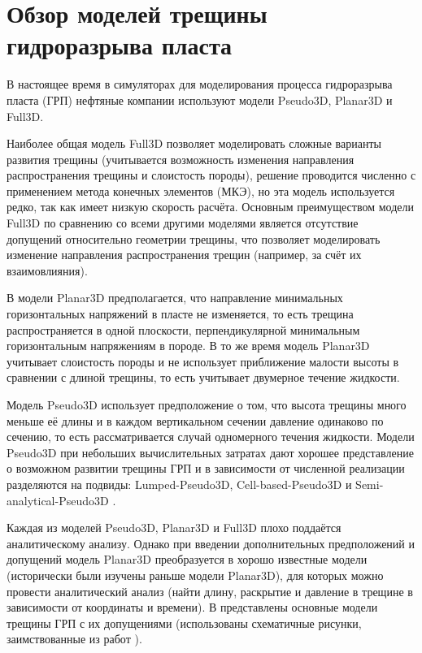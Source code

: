 \chapter{Обзор моделей трещины гидроразрыва пласта} \label{ch2}

В настоящее время в симуляторах для моделирования процесса гидроразрыва пласта (ГРП) нефтяные компании используют модели Pseudo3D, Planar3D и Full3D.

Наиболее общая модель Full3D позволяет моделировать сложные варианты развития трещины (учитывается возможность изменения направления распространения трещины и слоистость породы), решение проводится численно с применением метода конечных элементов (МКЭ), но эта модель используется редко, так как имеет низкую скорость расчёта.
Основным преимуществом модели Full3D по сравнению со всеми другими моделями является отсутствие допущений относительно геометрии трещины, что позволяет моделировать изменение направления распространения трещин (например, за счёт их взаимовлияния).

В модели Planar3D предполагается, что направление минимальных горизонтальных напряжений в пласте не изменяется, то есть трещина распространяется в одной плоскости, перпендикулярной минимальным горизонтальным напряжениям в породе.
В то же время модель Planar3D учитывает слоистость породы и не использует приближение малости высоты в сравнении с длиной трещины, то есть учитывает двумерное течение жидкости.

Модель Pseudo3D использует предположение о том, что высота трещины много меньше её длины и в каждом вертикальном сечении давление одинаково по сечению, то есть рассматривается случай одномерного течения жидкости.
Модели Pseudo3D при небольших вычислительных затратах дают хорошее представление о возможном развитии трещины ГРП и в зависимости от численной реализации разделяются на подвиды: Lumped-Pseudo3D, Cell-based-Pseudo3D \cite{adachi} и Semi-analytical-Pseudo3D \cite{shel_paderin}.

Каждая из моделей Pseudo3D, Planar3D и Full3D плохо поддаётся аналитическому анализу.
Однако при введении дополнительных предположений и допущений модель Planar3D преобразуется в хорошо известные модели (исторически были изучены раньше модели Planar3D), для которых можно провести аналитический анализ (найти длину, раскрытие и давление в трещине в зависимости от координаты и времени).
В  представлены основные модели трещины ГРП с их допущениями (использованы схематичные рисунки, заимствованные из работ \cite{valov_baykin_dontsov, baykin_course, adachi, dontsov_peirce}).

